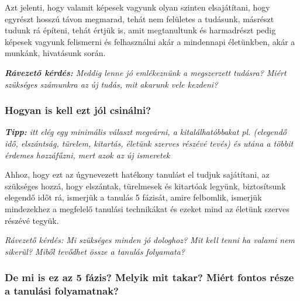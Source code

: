 \documentclass[../Main.tex]{subfiles}
\begin{document}
Azt jelenti, hogy valamit képesek vagyunk olyan szinten elsajátítani, hogy egyrészt hosszú távon megmarad,
tehát nem felületes a tudásunk, másrészt tudunk rá építeni, tehát értjük is,
amit megtanultunk és harmadrészt pedig képesek vagyunk felismerni és felhasználni akár a mindennapi életünkben,
akár a munkánk, hivatásunk során.

\textit{\textbf{Rávezető kérdés:} Meddig lenne jó emlékeznünk a megszerzett tudásra? Miért szükséges számunkra az új tudás, mit akarunk vele kezdeni?}

\subsubsection{Hogyan is kell ezt jól csinálni?}
\textit{\textbf{Tipp:} itt elég egy minimális választ megvárni, a kitalálhatóbbakat pl.
 (elegendő idő, elszántság, türelem, kitartás, életünk szerves részévé tevés)
 és utána a többit érdemes hozzáfűzni, mert azok az új ismeretek}

 
Ahhoz, hogy ezt az úgynevezett hatékony tanulást el tudjuk sajátítani, az szükséges hozzá, hogy elszántak,
türelmesek és kitartóak legyünk, biztosítsunk elegendő időt rá, ismerjük a tanulás 5 fázisát,
amire felbomlik, ismerjük mindezekhez a megfelelő tanulási technikákat és ezeket mind az 
életünk szerves részévé tegyük.
 
\textit{\textit{Rávezető kérdés}: Mi szükséges minden jó dologhoz?
 Mit kell tenni ha valami nem sikerül?
 Miből tevődhet össze a tanulás folyamata?}

 \subsubsection{De mi is ez az 5 fázis? \newline Melyik mit takar? \newline Miért fontos része a tanulási folyamatnak?}
\end{document}
